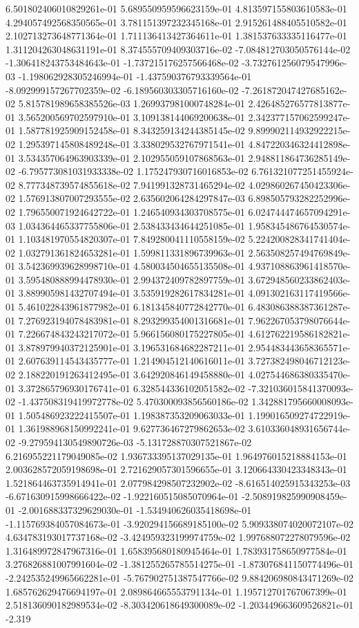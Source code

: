 	6.501802406010829261e-01	5.689550959596623159e-01	4.813597155803610583e-01	4.294057492568350565e-01	3.781151397232345168e-01	2.915261488405510582e-01	2.102713273648771364e-01	1.711136413427364611e-01	1.381537633335116477e-01	1.311204263048631191e-01	8.374555709409303716e-02	-7.084812703050576144e-02	-1.306418243753484643e-01	-1.737215176257566468e-02	-3.732761256079547996e-03	-1.198062928305246994e-01	-1.437590376793339564e-01	-8.092999157267702359e-02	-6.189560303305716160e-02	-7.261872047427685162e-02	5.815781989658385526e-03	1.269937981000748284e-01	2.426485276577813877e-01	3.565200569702597910e-01	3.109138144069200638e-01	2.342377157062599247e-01	1.587781925909152458e-01	8.343259134244385145e-02	9.899902114932922215e-02	1.295397145808489248e-01	3.338029532767971541e-01	4.847220346324412898e-01	3.534357064963903339e-01	2.102955059107868563e-01	2.948811864736285149e-02	-6.795773081031933338e-02	1.175247930716016853e-02	6.761321077251455924e-02	8.777348739574855618e-02	7.941991328731465294e-02	4.029860267450423306e-02	1.576913807007293555e-02	2.635602064284297847e-03	6.898505793282252996e-02	1.796550071924642722e-01	1.246540934303708575e-01	6.024744474657094291e-03	1.034364465337755806e-01	2.538433434644251085e-01	1.958345486764530574e-01	1.103481970554820307e-01	7.849280041110558159e-02	5.224200828341741404e-02	1.032791361824653281e-01	1.599811331896739963e-01	2.563508257494769849e-01	3.542369939628998710e-01	4.580034504655135508e-01	4.937108863961418570e-01	3.595480888994478930e-01	2.994372409782897759e-01	3.672948560233862403e-01	3.889905981432707494e-01	3.535919282617834281e-01	4.091302163117419566e-01	5.461022843961877982e-01	6.181345840772842770e-01	6.483086388387361287e-01	7.276923194078483981e-01	8.293299354001316681e-01	7.962267053798076644e-01	7.226674843243217072e-01	5.966156080175227805e-01	4.612762219586182821e-01	3.878979940372125901e-01	3.196531684682287211e-01	2.954483443658365571e-01	2.607639114543435777e-01	1.214904512140616011e-01	3.727382498046712123e-02	2.188220191263412495e-01	3.642920846149458880e-01	4.027544686380335470e-01	3.372865796930176741e-01	6.328544336102051582e-02	-7.321036015841370093e-02	-1.437508319419972778e-02	5.470300093856560186e-02	1.342881795660008093e-01	1.505486923222415507e-01	1.198387353209063033e-01	1.199016509274722919e-01	1.361988968150992241e-01	9.627736467279862653e-02	3.610336048931656744e-02	-9.279594130549890726e-03	-5.131728870307521867e-02	6.216955221179049085e-02	1.936733395137029135e-01	1.964976015218884153e-01	2.003628572059198698e-01	2.721629057301596655e-01	3.120664330423348343e-01	1.521864463735914941e-01	2.077984298507232902e-02	-8.616514025915343253e-03	-6.671630915998666422e-02	-1.922160515085070964e-01	-2.508919825990908459e-01	-2.001688337329629030e-01	-1.534940626035418698e-01	-1.115769384057084673e-01	-3.920294156689185100e-02	5.909338074020072107e-02	4.634783193017737168e-02	-3.424959323199974759e-02	1.997688072278079596e-02	1.316489972847967316e-01	1.658395680180945464e-01	1.783931758650977584e-01	3.276826881007991604e-02	-1.381255265785514275e-01	-1.873076841150774496e-01	-2.242535249965662281e-01	-5.767902751387547766e-02	9.884206980843471269e-02	1.685762629476694197e-01	2.089864665553791134e-01	1.195712701767067399e-01	2.518136090182989534e-02	-8.303420618649300089e-02	-1.203449663609526821e-01	-2.319
